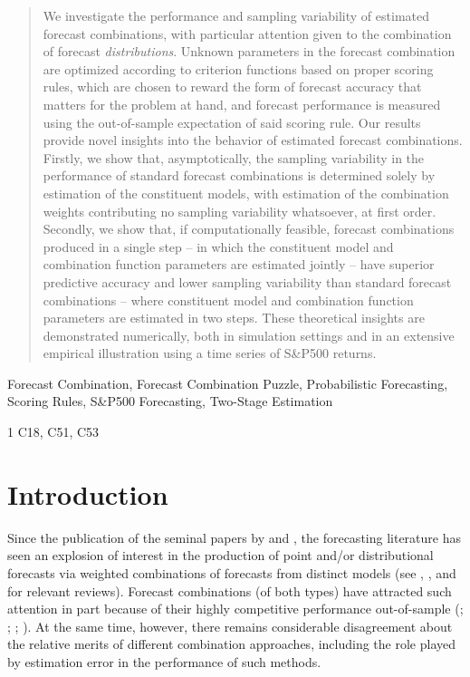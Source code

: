 \documentclass[12pt]{article}
\newcommand{\blind}{1}
\theoremstyle{definition}
\theoremstyle{remark}
\begin{document}
\bigskip
\begin{abstract}
We investigate the performance and sampling variability of estimated forecast combinations, with particular attention given to the combination of forecast \textit{distributions}. Unknown parameters in the forecast combination are optimized according to criterion functions based on proper scoring rules, which are chosen to reward the form of forecast accuracy that matters for the problem at hand, and forecast performance is measured using the out-of-sample expectation of said scoring rule. Our results provide novel insights into the behavior of estimated forecast combinations. Firstly, we show that, {asymptotically}, the sampling variability in the performance of standard forecast combinations is determined {solely} by estimation of the constituent models, with estimation of the combination weights contributing no sampling variability whatsoever, at first order. Secondly, we show that, if computationally feasible, forecast combinations produced in a single step -- in which the constituent model and combination function parameters are estimated jointly -- have superior {predictive }accuracy and lower sampling variability than standard forecast combinations -- where constituent model and combination function parameters are estimated in two steps. These theoretical insights are demonstrated numerically, both in simulation settings and in an extensive empirical illustration using a time series of S\&P500 returns.
\end{abstract}

  Forecast Combination, Forecast Combination Puzzle, Probabilistic Forecasting, Scoring Rules, S\&P500 Forecasting, Two-Stage Estimation

\blind
{
   C18, C51, C53 \\
} \fi

\vfill

\newpage
{}

\section{Introduction}

Since the publication of the seminal papers by \cite{Stone1961} and \cite{Bates1969}, the forecasting literature has seen an explosion of interest in the production of point and/or distributional forecasts via weighted combinations of forecasts from distinct models (see \citealp{Timmermann2006}, \citealp{Aastveit2019}, and \citealp{Wang2022} for relevant reviews). Forecast combinations (of both types) have attracted such attention in part because of their highly competitive performance out-of-sample (\citealp{Makridakis2018, Makridakis2020}; \citealp{Thorey2018}; \citealp{Wang2018}; \citealp{Taylor2020}). At the same time, however, there remains considerable disagreement about the relative merits of different combination approaches, including the role played by estimation error in the performance of such methods.
\end{document}
